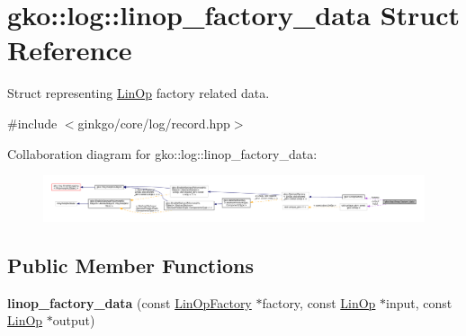 \hypertarget{structgko_1_1log_1_1linop__factory__data}{}\section{gko\+:\+:log\+:\+:linop\+\_\+factory\+\_\+data Struct Reference}
\label{structgko_1_1log_1_1linop__factory__data}


Struct representing \hyperlink{classgko_1_1LinOp}{Lin\+Op} factory related data.  




{\ttfamily \#include $<$ginkgo/core/log/record.\+hpp$>$}



Collaboration diagram for gko\+:\+:log\+:\+:linop\+\_\+factory\+\_\+data\+:
\nopagebreak
\begin{figure}[H]
\begin{center}
\leavevmode
\includegraphics[width=350pt]{structgko_1_1log_1_1linop__factory__data__coll__graph}
\end{center}
\end{figure}
\subsection*{Public Member Functions}
\begin{DoxyCompactItemize}
\item 
\mbox{\label{structgko_1_1log_1_1linop__factory__data_afdd697450366f617de9cc546d465a26f}} 
{\bfseries linop\+\_\+factory\+\_\+data} (const \hyperlink{classgko_1_1LinOpFactory}{Lin\+Op\+Factory} $\ast$factory, const \hyperlink{classgko_1_1LinOp}{Lin\+Op} $\ast$input, const \hyperlink{classgko_1_1LinOp}{Lin\+Op} $\ast$output)
\end{DoxyCompactItemize}
